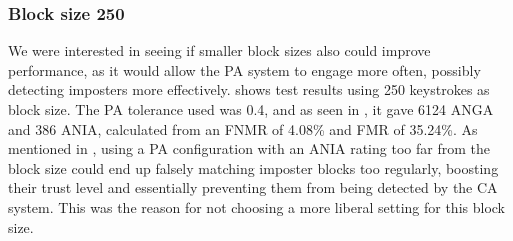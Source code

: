 
\subsubsection{Block size 250}
We were interested in seeing if smaller block sizes also could improve performance, as it would allow the PA system to engage more often, possibly detecting imposters more effectively.
 shows test results using 250 keystrokes as block size.
The PA tolerance used was 0.4, and as seen in , it gave 6124 ANGA and 386 ANIA, calculated from an FNMR of 4.08\% and FMR of 35.24\%.
As mentioned in , using a PA configuration with an ANIA rating too far from the block size could end up falsely matching imposter blocks too regularly, boosting their trust level and essentially preventing them from being detected by the CA system.
This was the reason for not choosing a more liberal setting for this block size.

